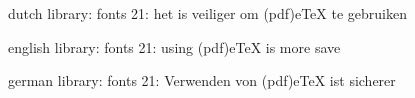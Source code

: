 


\startmessages  dutch  library: fonts
     21: het is veiliger om (pdf)eTeX te gebruiken
\stopmessages

\startmessages  english  library: fonts
     21: using (pdf)eTeX is more save 
\stopmessages

\startmessages  german  library: fonts
     21: Verwenden von (pdf)eTeX ist sicherer
\stopmessages

\unprotect 

